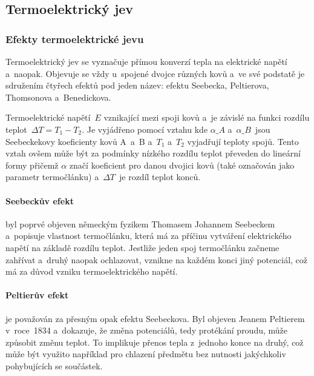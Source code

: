 \subsection{Termoelektrický jev}
\subsubsection{Efekty termoelektrické jevu}
\label{sec:efekty-termoelektrika}
Termoelektrický jev se vyznačuje přímou konverzí tepla na elektrické napětí
a~naopak. Objevuje se vždy u~spojené dvojce různých kovů a~ve své podstatě je
sdružením čtyřech efektů pod jeden název: efektu Seebecka, Peltierova,
Thomsonova a~Benedickova.~

Termoelektrické napětí~$E$ vznikající mezi spoji kovů a~je závislé na funkci
rozdílu teplot~$\Delta T = T_1 - T_2$. Je vyjádřeno pomocí vztahu
kde $\alpha\_A$ a~$\alpha\_B$~jsou  Seebeckekovy koeficienty kovů A~a~B a~$T_1$
a~$T_2$ vyjadřují teploty spojů.  Tento vztah ovšem může být za podmínky
nízkého rozdílu teplot převeden do lineární formy
přičemž $\alpha$ značí koeficient pro danou dvojici kovů (také označován jako
parametr termočlánku) a~$\Delta T$~je  rozdíl teplot konců.~\cite{diplomka}

\paragraph{Seebeckův efekt} byl poprvé objeven německým fyzikem Thomasem
Johannem Seebeckem a~popisuje vlastnost termočlánku, která má za příčinu
vytváření elektrického napětí na základě rozdílu teplot. Jestliže jeden spoj
termočlánku začneme zahřívat a~druhý naopak ochlazovat, vznikne na každém konci
jiný potenciál, což má za důvod vzniku termoelektrického
napětí.~\cite{jreichl-seebeck}

\paragraph{Peltierův efekt} je považován za přesným opak efektu Seebeckova. Byl
objeven Jeanem Peltierem v~roce~1834 a~dokazuje, že změna potenciálů, tedy
protékání proudu, může způsobit změnu teplot. To implikuje přenos tepla
z~jednoho konce na druhý, což může být využito například pro chlazení předmětu
bez nutnosti jakýchkoliv pohybujících se součástek.~

